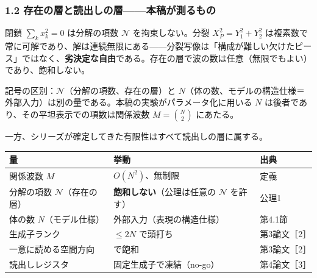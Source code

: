 \documentclass[
  a4paper,
]{ltjsarticle}
\newcounter{none} %
\begin{document}
\subsubsection{1.2
存在の層と読出しの層------本稿が測るもの}\label{ux5b58ux5728ux306eux5c64ux3068ux8aadux51faux3057ux306eux5c64ux672cux7a3fux304cux6e2cux308bux3082ux306e}

閉鎖 \(\sum_k x_k^2=0\) は分解の項数 \(\mathcal N\) を拘束しない。分裂
\(X_P^2=Y_1^2+Y_2^2\)
は複素数で常に可解であり、解は連続無限にある------分裂写像は「構成が難しい欠けたピース」ではなく、\textbf{劣決定な自由}である。存在の層で波の数は任意（無限でもよい）であり、飽和しない。

記号の区別：\(\mathcal N\)（分解の項数、存在の層）と
\(N\)（体の数、モデルの構造仕様＝外部入力）は別の量である。本稿の実験がパラメータ化に用いる
\(N\) は後者であり、その平坦表示での項数は関係波数 \(M=\binom N2\)
にあたる。

一方、シリーズが確定してきた有限性はすべて読出しの層に属する。

{\def\LTcaptype{none} %
\begin{longtable}[]{@{}
  >{\raggedright\arraybackslash}p{}
  >{\raggedright\arraybackslash}p{}
  >{\raggedright\arraybackslash}p{}@{}}
\toprule\noalign{}
\begin{minipage}[b]{\linewidth}\raggedright
量
\end{minipage} & \begin{minipage}[b]{\linewidth}\raggedright
挙動
\end{minipage} & \begin{minipage}[b]{\linewidth}\raggedright
出典
\end{minipage} \\
\midrule\noalign{}
\endhead
\bottomrule\noalign{}
\endlastfoot
関係波数 \(M\) & \(O(N^2)\)、無制限 & 定義 \\
分解の項数 \(\mathcal N\)（存在の層） &
\textbf{飽和しない}（公理は任意の \(\mathcal N\) を許す） & 公理1 \\
体の数 \(N\)（モデル仕様） & 外部入力（表現の構造仕様） & 第4.1節 \\
生成子ランク & \(\le 2N\) で頭打ち & 第3論文［2］ \\
一意に読める空間方向 & 3 で飽和 & 第3論文［2］ \\
読出しレジスタ & 固定生成子で凍結（no-go） & 第4論文［3］ \\
\end{longtable}
}
\end{document}
